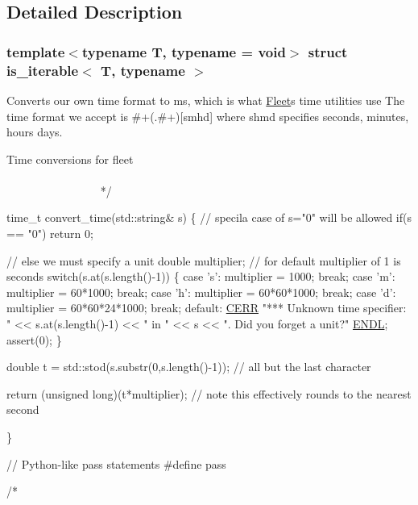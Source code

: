 \subsection{Detailed Description}
\subsubsection*{template$<$typename T, typename = void$>$\newline
struct is\+\_\+iterable$<$ T, typename $>$}

Converts our own time format to ms, which is what \hyperlink{namespace_fleet}{Fleet}\textquotesingle{}s time utilities use The time format we accept is \#+(.\#+)\mbox{[}smhd\mbox{]} where shmd specifies seconds, minutes, hours days. 


\begin{DoxyCode}
    Time conversions \textcolor{keywordflow}{for} fleet
   ~~~~~~~~~~~~~~~~~~~~~~~~~~~~~~~~~~~~~~~~~~~~~~~~~~~~~~~~~~~~~~~~~~~~~~~~~~~~~~~~~~~~~~~~ */

time\_t convert\_time(std::string& s) \{
    \textcolor{comment}{// specila case of s="0" will be allowed}
    \textcolor{keywordflow}{if}(s == \textcolor{stringliteral}{"0"}) \textcolor{keywordflow}{return} 0;

    \textcolor{comment}{// else we must specify a unit  }
    \textcolor{keywordtype}{double} multiplier; \textcolor{comment}{// for default multiplier of 1 is seconds}
    \textcolor{keywordflow}{switch}(s.at(s.length()-1)) \{
        \textcolor{keywordflow}{case} \textcolor{charliteral}{'s'}: multiplier = 1000; \textcolor{keywordflow}{break}; 
        \textcolor{keywordflow}{case} \textcolor{charliteral}{'m'}: multiplier = 60*1000; \textcolor{keywordflow}{break};
        \textcolor{keywordflow}{case} \textcolor{charliteral}{'h'}: multiplier = 60*60*1000; \textcolor{keywordflow}{break};
        \textcolor{keywordflow}{case} \textcolor{charliteral}{'d'}: multiplier = 60*60*24*1000; \textcolor{keywordflow}{break};
        \textcolor{keywordflow}{default}: 
            \hyperlink{_i_o_8h_a176c0577baa96c686397bca42f7ee6ff}{CERR} \textcolor{stringliteral}{"*** Unknown time specifier: "} << s.at(s.length()-1) << \textcolor{stringliteral}{" in "} << s << \textcolor{stringliteral}{". Did you
       forget a unit?"} \hyperlink{_i_o_8h_a90dc3f3ee970394e0080300526390a84}{ENDL};
            assert(0);
    \}

    \textcolor{keywordtype}{double} t = std::stod(s.substr(0,s.length()-1)); \textcolor{comment}{// all but the last character}

    \textcolor{keywordflow}{return} (\textcolor{keywordtype}{unsigned} \textcolor{keywordtype}{long})(t*multiplier); \textcolor{comment}{// note this effectively rounds to the nearest second }

\}

\textcolor{comment}{// Python-like pass statements}
\textcolor{preprocessor}{#define pass}


\textcolor{comment}{/*}
\end{DoxyCode}
